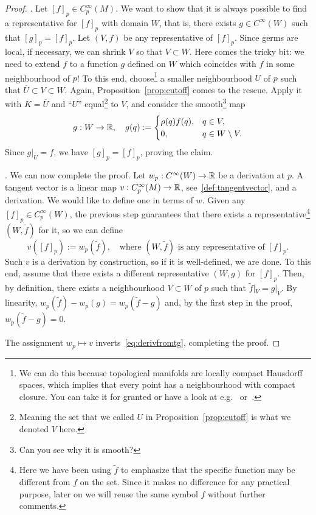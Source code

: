 \begin{proof}
	.
	Let $[f]_p\in C_p^\infty(M)$.
	We want to show that it is always possible to find a representative for $[f]_p$ with domain $W$, that is, there exists $g\in C^\infty(W)$ such that $[g]_p = [f]_p$.
	Let $(V, f)$ be any representative of $[f]_p$.
	Since germs are local, if necessary, we can shrink $V$ so that $V\subset W$.
	Here comes the tricky bit: we need to extend $f$ to a function $g$ defined on $W$ which coincides with $f$ in some neighbourhood of $p$!
	To this end, choose\footnote{We can do this because topological manifolds are locally compact Hausdorff spaces, which implies that every point has a neighbourhood with compact closure. You can take it for granted or have a look at e.g.~\cite[Lemma 4.65]{book:lee:topology} or~\cite{book:munkres:topology}.} a smaller neighbourhood $U$ of $p$ such that $\overline{U}\subset V\subset W$.
	Again, Proposition~\ref{prop:cutoff} comes to the rescue. Apply it with $K=\overline{U}$ and ``$U$'' equal\footnote{Meaning the set that we called $U$ in Proposition~\ref{prop:cutoff} is what we denoted $V$ here.} to $V$, and consider the smooth\footnote{Can you see why it is smooth?} map
	\begin{equation}
		g:W\to\mathbb{R}, \quad
		g(q) := \begin{cases}
			\rho(q)f(q), & q\in V,             \\
			0,           & q \in W\setminus V.
		\end{cases}
	\end{equation}
	Since $g|_U = f$, we have $[g]_p = [f]_p$, proving the claim.

	. We can now complete the proof.
	Let $w_p:C^\infty(W) \to\mathbb{R}$ be a derivation at $p$.
	A tangent vector is a linear map $v:C_p^\infty(M)\to\mathbb{R}$, see~\eqref{def:tangentvector}, and a derivation.
	We would like to define one in terms of $w$.
	Given any $[f]_p\in C_p^\infty(W)$, the previous step guarantees that there exists a representative\footnote{Here we have been using $\widetilde{f}$ to emphasize that the specific function may be different from $f$ on the set. Since it makes no difference for any practical purpose, later on we will reuse the same symbol $f$ without further comments.} $(W,\widetilde{f})$ for it, so we can define
	\begin{equation}
		v([f]_p) := w_p(\widetilde{f}), \quad\mbox{where $(W,\widetilde{f})$ is any representative of $[f]_p$}.
	\end{equation}
	Such $v$ is a derivation by construction, so if it is well-defined, we are done.
	To this end, assume that there exists a different representative $(W, g)$ for $[f]_p$.
	Then, by definition, there exists a neighbourhood $V\subset W$ of $p$ such that $\widetilde{f}|_V = g|_V$.
	By linearity, $w_p(\widetilde{f}) - w_p(g) = w_p(\widetilde{f}-g)$ and, by the first step in the proof, $w_p(\widetilde{f}-g) = 0$.

	The assignment $w_p\mapsto v$ inverts~\eqref{eq:derivfromtg}, completing the proof.
\end{proof}

